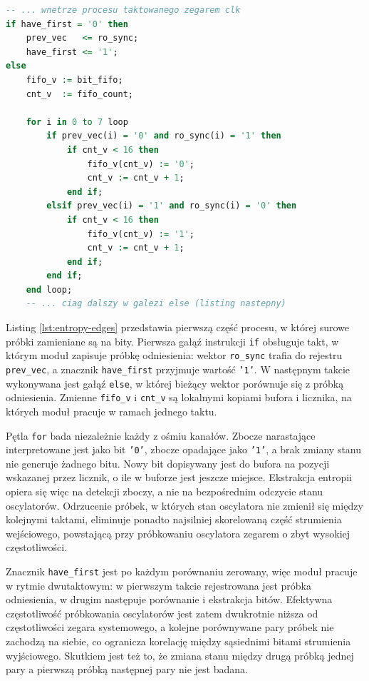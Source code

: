 \begin{lstlisting}[language=VHDL,
caption={Detekcja zboczy (entropy\_mixer.vhdl)},
label={lst:entropy-edges}]
-- ... wnetrze procesu taktowanego zegarem clk
if have_first = '0' then
    prev_vec   <= ro_sync;
    have_first <= '1';
else
    fifo_v := bit_fifo;
    cnt_v  := fifo_count;

    for i in 0 to 7 loop
        if prev_vec(i) = '0' and ro_sync(i) = '1' then
            if cnt_v < 16 then
                fifo_v(cnt_v) := '0';
                cnt_v := cnt_v + 1;
            end if;
        elsif prev_vec(i) = '1' and ro_sync(i) = '0' then
            if cnt_v < 16 then
                fifo_v(cnt_v) := '1';
                cnt_v := cnt_v + 1;
            end if;
        end if;
    end loop;
    -- ... ciag dalszy w galezi else (listing nastepny)
\end{lstlisting}

Listing \ref{lst:entropy-edges} przedstawia pierwszą część procesu, w której
surowe próbki zamieniane są na bity. Pierwsza gałąź instrukcji \texttt{if}
obsługuje takt, w którym moduł zapisuje próbkę odniesienia: wektor
\texttt{ro\_sync} trafia do rejestru \texttt{prev\_vec}, a znacznik
\texttt{have\_first} przyjmuje wartość \texttt{'1'}. W następnym takcie
wykonywana jest gałąź \texttt{else}, w której bieżący wektor porównuje się
z próbką odniesienia. Zmienne \texttt{fifo\_v} i \texttt{cnt\_v} są lokalnymi
kopiami bufora i licznika, na których moduł pracuje w ramach jednego taktu.

Pętla \texttt{for} bada niezależnie każdy z ośmiu kanałów. Zbocze narastające
interpretowane jest jako bit \texttt{'0'}, zbocze opadające jako \texttt{'1'},
a brak zmiany stanu nie generuje żadnego bitu. Nowy bit dopisywany jest do
bufora na pozycji wskazanej przez licznik, o ile w buforze jest jeszcze miejsce.
Ekstrakcja entropii opiera się więc na detekcji zboczy, a nie na bezpośrednim
odczycie stanu oscylatorów. Odrzucenie próbek, w których stan oscylatora nie
zmienił się między kolejnymi taktami, eliminuje ponadto najsilniej skorelowaną
część strumienia wejściowego, powstającą przy próbkowaniu oscylatora zegarem
o zbyt wysokiej częstotliwości.

Znacznik \texttt{have\_first} jest po każdym porównaniu zerowany, więc moduł
pracuje w rytmie dwutaktowym: w pierwszym takcie rejestrowana jest próbka
odniesienia, w drugim następuje porównanie i ekstrakcja bitów. Efektywna
częstotliwość próbkowania oscylatorów jest zatem dwukrotnie niższa od
częstotliwości zegara systemowego, a kolejne porównywane pary próbek nie
zachodzą na siebie, co ogranicza korelację między sąsiednimi bitami strumienia
wyjściowego. Skutkiem jest też to, że zmiana stanu między drugą próbką jednej
pary a pierwszą próbką następnej pary nie jest badana.

